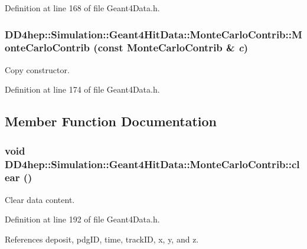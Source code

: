 Definition at line 168 of file Geant4Data.h.\hypertarget{class_d_d4hep_1_1_simulation_1_1_geant4_hit_data_1_1_monte_carlo_contrib_a71e9bcc92b1997f224426aa7418f452c}{
\subsubsection[{MonteCarloContrib}]{\setlength{\rightskip}{0pt plus 5cm}DD4hep::Simulation::Geant4HitData::MonteCarloContrib::MonteCarloContrib (const {\bf MonteCarloContrib} \& {\em c})}}
\label{class_d_d4hep_1_1_simulation_1_1_geant4_hit_data_1_1_monte_carlo_contrib_a71e9bcc92b1997f224426aa7418f452c}


Copy constructor. 

Definition at line 174 of file Geant4Data.h.

\subsection{Member Function Documentation}
\hypertarget{class_d_d4hep_1_1_simulation_1_1_geant4_hit_data_1_1_monte_carlo_contrib_af7e749692449e5c3294c3c60b5d056fe}{
\subsubsection[{clear}]{\setlength{\rightskip}{0pt plus 5cm}void DD4hep::Simulation::Geant4HitData::MonteCarloContrib::clear ()}}
\label{class_d_d4hep_1_1_simulation_1_1_geant4_hit_data_1_1_monte_carlo_contrib_af7e749692449e5c3294c3c60b5d056fe}


Clear data content. 

Definition at line 192 of file Geant4Data.h.

References deposit, pdgID, time, trackID, x, y, and z.

